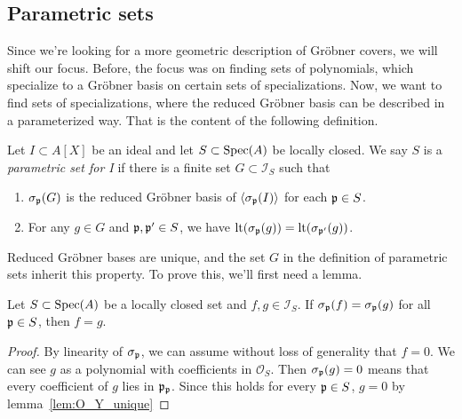 \subsection{Parametric sets}
Since we're looking for a more geometric description of Gröbner covers, we will shift our focus. Before, the focus was on finding sets of polynomials, which specialize to a Gröbner basis on certain sets of specializations. Now, we want to find sets of specializations, where the reduced Gröbner basis can be described in a parameterized way. That is the content of the following definition.

\begin{definition}
  Let $I \subset A[X]$ be an ideal and let $S \subset \operatorname{Spec}(A)$ be locally closed. We say $S$ is a \textit{parametric set for I} if there is a finite set $G \subset \mathcal I_{S}$ such that
  \begin{enumerate}
    \item $\sigma_{\mathfrak p}(G)$ is the reduced Gröbner basis of $\langle \sigma_{\mathfrak p}(I) \rangle$ for each $\mathfrak p \in S$.
    \item For any $g \in G$ and $\mathfrak p, \mathfrak p' \in S$, we have $\operatorname{lt}(\sigma_{\mathfrak p}(g)) = \operatorname{lt}(\sigma_{\mathfrak p'}(g))$.
  \end{enumerate}
\end{definition}

Reduced Gröbner bases are unique, and the set $G$ in the definition of parametric sets inherit this property. To prove this, we'll first need a lemma.

\begin{lemma}\label{lem:parametric_grb_unique}
  Let $S \subset \operatorname{Spec}(A)$ be a locally closed set and $f, g \in \mathcal I_{S}$. If $\sigma_{\mathfrak p}(f) = \sigma_{\mathfrak p}(g)$ for all $\mathfrak p \in S$, then $f = g$.
\end{lemma}
\begin{proof}
  By linearity of $\sigma_{\mathfrak p}$, we can assume without loss of generality that $f = 0$. We can see $g$ as a polynomial with coefficients in $\mathcal O_{S}$. Then $\sigma_{\mathfrak p}(g) = 0$ means that every coefficient of $g$ lies in $\mathfrak p_{\mathfrak p}$. Since this holds for every $\mathfrak p \in S$, $g = 0$ by lemma~\ref{lem:O_Y_unique}
\end{proof}

